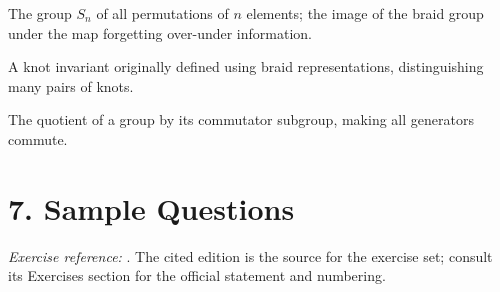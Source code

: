 \begin{description}[leftmargin=*,style=nextline,itemsep=0.3em]
\item[\textbf{Symmetric group.}] The group $S_n$ of all permutations of $n$ elements; the image of the braid group under the map forgetting over-under information.

\item[\textbf{Jones polynomial.}] A knot invariant originally defined using braid representations, distinguishing many pairs of knots.

\item[\textbf{Abelianization.}] The quotient of a group by its commutator subgroup, making all generators commute.

\end{description}

\section*{7. Sample Questions}
\emph{Exercise reference:} \cite{braid_theory_ref1}. The cited edition is the source for the exercise set; consult its Exercises section for the official statement and numbering.

